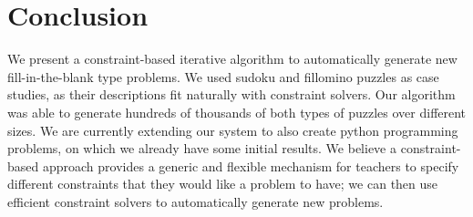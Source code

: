 \section{Conclusion}

We present a constraint-based iterative algorithm to automatically generate new fill-in-the-blank type problems. We used sudoku and fillomino puzzles as case studies, as their descriptions fit naturally with constraint solvers. Our algorithm was able to generate hundreds of thousands of both types of puzzles over different sizes. We are currently extending our system to also create python programming problems, on which we already have some initial results. We believe a constraint-based approach provides a generic and flexible mechanism for teachers to specify different constraints that they would like a problem to have; we can then use efficient constraint solvers to automatically generate new problems.